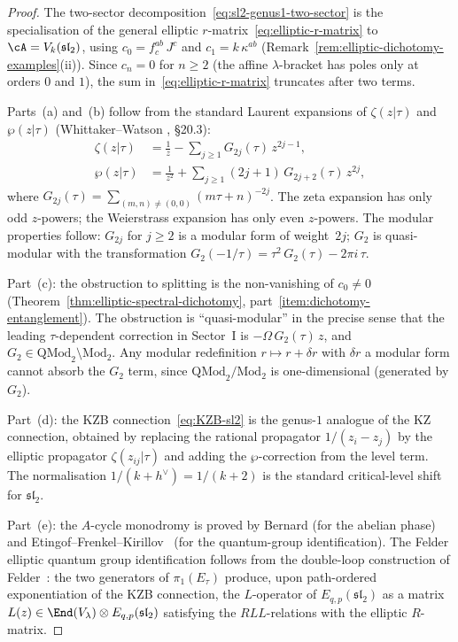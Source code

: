\begin{proof}
The two-sector
decomposition~\eqref{eq:sl2-genus1-two-sector} is the
specialisation of the general elliptic
$r$-matrix~\eqref{eq:elliptic-r-matrix} to
$\cA = V_k(\mathfrak{sl}_2)$, using
$c_0 = f^{ab}_c\, J^c$ and $c_1 = k\,\kappa^{ab}$
(Remark~\ref{rem:elliptic-dichotomy-examples}(ii)).
Since $c_n = 0$ for $n \ge 2$ (the affine $\lambda$-bracket
has poles only at orders $0$ and $1$), the sum
in~\eqref{eq:elliptic-r-matrix} truncates after two terms.

Parts~(a) and~(b) follow from the standard Laurent expansions
of $\zeta(z|\tau)$ and $\wp(z|\tau)$
(Whittaker--Watson \cite{WW27}, \S20.3):
\begin{align*}
 \zeta(z|\tau)
 &= \frac{1}{z}
 - \sum_{j \ge 1} G_{2j}(\tau)\, z^{2j-1},
 \\
 \wp(z|\tau)
 &= \frac{1}{z^2}
 + \sum_{j \ge 1} (2j+1)\, G_{2j+2}(\tau)\, z^{2j},
\end{align*}
where $G_{2j}(\tau) = \sum_{(m,n) \ne (0,0)}
(m\tau + n)^{-2j}$. The zeta expansion has only odd
$z$-powers; the Weierstrass expansion has only even
$z$-powers. The modular properties follow: $G_{2j}$ for
$j \ge 2$ is a modular form of weight~$2j$; $G_2$ is
quasi-modular with the transformation
$G_2(-1/\tau) = \tau^2\,G_2(\tau) - 2\pi i\,\tau$.

Part~(c): the obstruction to splitting is the non-vanishing
of $c_0 \ne 0$ (Theorem~\ref{thm:elliptic-spectral-dichotomy},
part~\ref{item:dichotomy-entanglement}). The obstruction is
``quasi-modular'' in the precise sense that the leading
$\tau$-dependent correction in Sector~I is
$-\Omega\,G_2(\tau)\,z$, and
$G_2 \in \mathrm{QMod}_2 \setminus \mathrm{Mod}_2$.
Any modular redefinition $r \mapsto r + \delta r$ with
$\delta r$ a modular form cannot absorb the $G_2$ term,
since $\mathrm{QMod}_2/\mathrm{Mod}_2$ is one-dimensional
(generated by $G_2$).

Part~(d): the KZB connection~\eqref{eq:KZB-sl2} is the
genus-$1$ analogue of the KZ connection, obtained by
replacing the rational propagator $1/(z_i - z_j)$ by the
elliptic propagator $\zeta(z_{ij}|\tau)$ and adding the
$\wp$-correction from the level term. The normalisation
$1/(k + h^\vee) = 1/(k+2)$ is the standard critical-level
shift for $\mathfrak{sl}_2$.

Part~(e): the $A$-cycle monodromy is proved by Bernard
\cite{Ber88} (for the abelian phase) and
Etingof--Frenkel--Kirillov~\cite{EFK98}
(for the quantum-group identification). The Felder elliptic
quantum group identification follows from the double-loop
construction of Felder~\cite{Fel94}: the two generators
of $\pi_1(E_\tau)$ produce, upon path-ordered exponentiation
of the KZB connection, the $L$-operator of
$E_{q,p}(\mathfrak{sl}_2)$ as a matrix
$L(z) \in \End(V_\lambda) \otimes E_{q,p}(\mathfrak{sl}_2)$
satisfying the $RLL$-relations with the elliptic $R$-matrix.
\end{proof}

